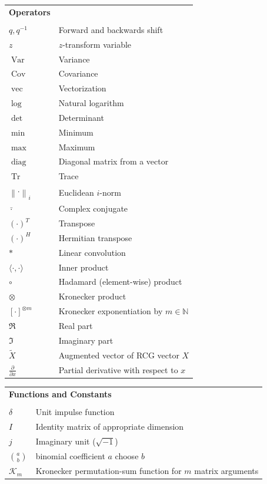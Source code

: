 \documentclass[11pt,twoside]{report}
\newcommand{\norm}[1]{\left\lVert#1\right\rVert}
\DeclareMathOperator{\Tr}{Tr}
\DeclareMathOperator{\Var}{Var}
\DeclareMathOperator{\Cov}{Cov}
\DeclareMathOperator{\diag}{diag}
\DeclareMathOperator{\vect}{vec}
\begin{document}
\begin{longtable}{p{} p{}}
\textbf{Operators} & \null \\ %
\\
$q, q^{-1}$ & Forward and backwards shift \\
$z$ & $z$-transform variable \\
$\Var$ & Variance \\
$\Cov$ & Covariance \\
$\vect$ & Vectorization \\
$\log$ & Natural logarithm \\
$\det$ & Determinant \\
$\min$ & Minimum \\
$\max$ & Maximum \\
$\diag$ & Diagonal matrix from a vector \\ 
$\Tr$ & Trace \\
$\norm{\cdot}_i$ & Euclidean $i$-norm \\ 
$\bar{\cdot}$ & Complex conjugate \\
$(\cdot)^T$ & Transpose \\
$(\cdot)^H$ & Hermitian transpose \\
$*$ & Linear convolution \\
$\langle \cdot,\cdot \rangle$ & Inner product \\
$\circ$ & Hadamard (element-wise) product \\
$\otimes$ & Kronecker product \\
$[\cdot]^{\otimes m}$ & Kronecker exponentiation by $m \in \mathbb{N}$ \\
$\mathfrak{R}$ & Real part \\
$\mathfrak{I}$ & Imaginary part \\
$\widetilde{X}$ & Augmented vector of RCG vector $X$ \\
$\frac{\partial}{\partial x}$ & Partial derivative with respect to $x$ 
\end{longtable}
\thispagestyle{plain}

\vspace{2cm}
\begin{longtable}{p{} p{}}
\multicolumn{2}{l}{\textbf{Functions and Constants}} \\ %
\\
$\delta$ & Unit impulse function \\
$I$ & Identity matrix of appropriate dimension \\
$j$ & Imaginary unit ($\sqrt{-1}$) \\
$\binom{a}{b}$ & binomial coefficient $a$ choose $b$ \\
$\mathcal{K}_m$ & Kronecker permutation-sum function for $m$ matrix arguments
\end{longtable}
\thispagestyle{plain}
\end{document}
